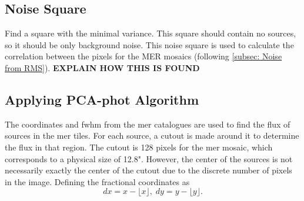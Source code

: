 \subsection{Noise Square}
Find a square with the minimal variance. This square should contain no sources, so it should be only background noise. This noise square is used to calculate the correlation between the pixels for the MER mosaics (following \autoref{subsec: Noise from RMS}).
\textbf{EXPLAIN HOW THIS IS FOUND}






\subsection{Applying PCA-phot Algorithm}\label{subsec: applying pca-phot algorithm}
The coordinates and \gls{fwhm} from the \gls{mer} catalogues are used to find the flux of sources in the \gls{mer} tiles.
For each source, a cutout is made around it to determine the flux in that region. The cutout is 128 pixels for the \gls{mer} mosaic, which corresponds to a physical size of 12.8". However, the center of the sources is not necessarily exactly the center of the cutout due to the discrete number of pixels in the image. 
Defining the fractional coordinates as
\begin{equation}
    dx = x - \lfloor x\rfloor,\;dy = y - \lfloor y\rfloor.
\end{equation}

